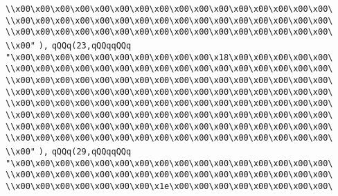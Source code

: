 \verb|\\x00\x00\x00\x00\x00\x00\x00\x00\x00\x00\x00\x00\x00\x00\x00\x00\|\newline
\verb|\\x00\x00\x00\x00\x00\x00\x00\x00\x00\x00\x00\x00\x00\x00\x00\x00\|\newline
\verb|\\x00\x00\x00\x00\x00\x00\x00\x00\x00\x00\x00\x00\x00\x00\x00\x00\|\newline
\verb|\\x00"|\newline
\verb|),|\newline
\verb|qQQq(23,qQQqqQQq|\newline
\verb|"\x00\x00\x00\x00\x00\x00\x00\x00\x00\x00\x18\x00\x00\x00\x00\x00\|\newline
\verb|\\x00\x00\x00\x00\x00\x00\x00\x00\x00\x00\x00\x00\x00\x00\x00\x00\|\newline
\verb|\\x00\x00\x00\x00\x00\x00\x00\x00\x00\x00\x00\x00\x00\x00\x00\x00\|\newline
\verb|\\x00\x00\x00\x00\x00\x00\x00\x00\x00\x00\x00\x00\x00\x00\x00\x00\|\newline
\verb|\\x00\x00\x00\x00\x00\x00\x00\x00\x00\x00\x00\x00\x00\x00\x00\x00\|\newline
\verb|\\x00\x00\x00\x00\x00\x00\x00\x00\x00\x00\x00\x00\x00\x00\x00\x00\|\newline
\verb|\\x00\x00\x00\x00\x00\x00\x00\x00\x00\x00\x00\x00\x00\x00\x00\x00\|\newline
\verb|\\x00\x00\x00\x00\x00\x00\x00\x00\x00\x00\x00\x00\x00\x00\x00\x00\|\newline
\verb|\\x00"|\newline
\verb|),|\newline
\verb|qQQq(29,qQQqqQQq|\newline
\verb|"\x00\x00\x00\x00\x00\x00\x00\x00\x00\x00\x00\x00\x00\x00\x00\x00\|\newline
\verb|\\x00\x00\x00\x00\x00\x00\x00\x00\x00\x00\x00\x00\x00\x00\x00\x00\|\newline
\verb|\\x00\x00\x00\x00\x00\x00\x00\x1e\x00\x00\x00\x00\x00\x00\x00\x00\|\newline
